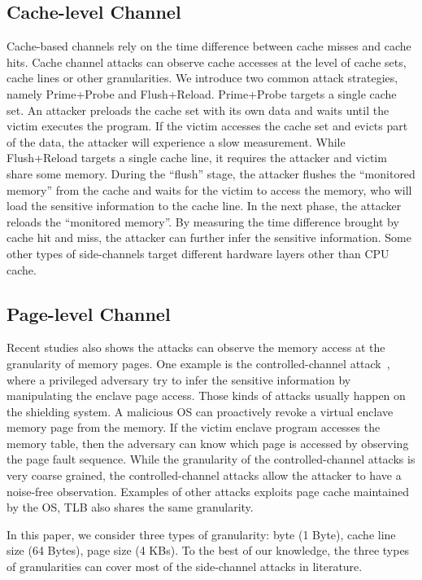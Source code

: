 \subsection{Cache-level Channel}
Cache-based channels rely on the time difference between cache misses and cache hits. Cache channel attacks can observe cache accesses at the level of cache sets, cache lines or other granularities. 
We introduce two common attack strategies, namely Prime+Probe and
Flush+Reload. Prime+Probe targets a single cache set. An
attacker preloads the cache set with its own data and waits until the victim
executes the program. If the victim accesses the cache set and evicts part of
the data, the attacker will experience a slow measurement. 
While Flush+Reload targets a single cache line, it requires the attacker and victim share some memory. During the ``flush'' stage, the attacker flushes the ``monitored
memory'' from the cache and waits for the victim to access the memory,
who will load the sensitive information to the cache line. In the next phase,
the attacker reloads the ``monitored memory''. By measuring the time difference
brought by cache hit and miss, the attacker can further infer the sensitive information. Some other types of side-channels target different hardware
layers other than CPU cache.

\subsection{Page-level Channel}
Recent studies also shows the attacks can observe the memory access at the granularity of memory pages. One example is the controlled-channel attack~\cite{xu2015controlled}, where a privileged adversary try to infer the sensitive information by manipulating the enclave page access. Those kinds of attacks usually happen on the shielding system. A malicious OS can proactively revoke a virtual enclave memory page from the memory. If the victim enclave program accesses the memory table, then the adversary can know which page is accessed by observing the page fault sequence. While the granularity of the controlled-channel attacks is very coarse grained, the controlled-channel attacks allow the attacker to have a noise-free observation. Examples of other attacks exploits page cache maintained by the OS, TLB also shares the same granularity.


In this paper, we consider three types of granularity: byte (1 Byte), cache line size (64 Bytes), page size (4 KBs). To the best of our knowledge, the three types of granularities can cover most of the side-channel attacks in literature.


